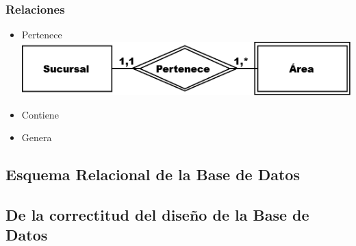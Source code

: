 \documentclass{article}
\begin{document}
\subsubsection{Relaciones}
\begin{itemize}
\item Pertenece
\includegraphics[scale=0.25]{Imagenes/Informe1/RelacionPertenece.png}
\item Contiene
\item Genera
\end{itemize}

\subsection{Esquema Relacional de la Base de Datos}

\subsection{De la correctitud del diseño de la Base de Datos}
\end{document}
